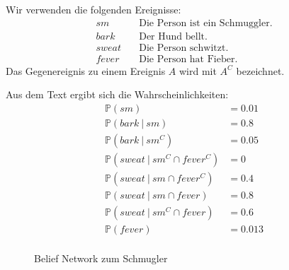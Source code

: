 \documentclass[a4paper]{scrartcl}
\newcommand{\prob}{\mathbb{P}}
\begin{document}
Wir verwenden die folgenden Ereignisse:
\begin{align*}
    sm &\quad \text{Die Person ist ein Schmuggler.} \\
    bark &\quad \text{Der Hund bellt.} \\
    sweat &\quad \text{Die Person schwitzt.} \\
    fever &\quad \text{Die Person hat Fieber.}
\end{align*}
Das Gegenereignis zu einem Ereignis $A$ wird mit $A^C$ bezeichnet.

Aus dem Text ergibt sich die Wahrscheinlichkeiten:
\begin{align*}
    \prob(sm) &= \num{0,01} \\
    \prob(bark\ |\ sm) &= \num{0,8} \\
    \prob(bark\ |\ sm^C) &= \num{0,05} \\
    \prob(sweat\ |\ sm^C \cap fever^C) &= \num{0} \\
    \prob(sweat\ |\ sm \cap fever^C) &= \num{0.4} \\
    \prob(sweat\ |\ sm \cap fever) &= \num{0.8} \\
    \prob(sweat\ |\ sm^C \cap fever) &= \num{0.6} \\
    \prob(fever) &= \num{0,013} \\
\end{align*}

\begin{figure}[h]
    \centering
    \caption{Belief Network zum Schmugler}
\end{figure}
\end{document}
